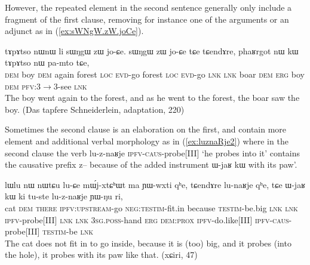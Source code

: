 \documentclass[oldfontcommands,oneside,a4paper,11pt]{article}
\newcommand{\ipa}[1]{{\phon \mbox{#1}}} %
\newcommand{\refb}[1]{(\ref{#1})}
\begin{document}
However, the repeated element in the second sentence generally only include a fragment of the first clause, removing for instance one of the arguments or an adjunct as in \refb{ex:sWNgW.zW.joCe}.

 \begin{exe}
\ex \label{ex:sWNgW.zW.joCe}
\gll 	\ipa{nɯ} 	\ipa{tɤpɤtso} 	\ipa{nɯnɯ} 	\ipa{li} 	\ipa{sɯŋgɯ} 	\ipa{zɯ} 	\ipa{jo-ɕe.} 	\ipa{sɯŋgɯ} 	\ipa{zɯ} 	\ipa{jo-ɕe} 	\ipa{tɕe} 	\ipa{tɕendɤre,} 	\ipa{phaʁrgot} 	\ipa{nɯ} 	\ipa{kɯ} 	\ipa{tɤpɤtso} 	\ipa{nɯ} 	\ipa{pa-mto} 	\ipa{tɕe,} 	\\
  \textsc{dem} boy \textsc{dem} again forest \textsc{loc} \textsc{evd}-go  forest \textsc{loc} \textsc{evd}-go \textsc{lnk} \textsc{lnk} boar \textsc{dem} \textsc{erg} boy \textsc{dem} \textsc{pfv}:3$\rightarrow$3-see \textsc{lnk}   \\
\glt The boy went again to the forest, and as he went to the forest, the boar saw the boy. (Das tapfere Schneiderlein, adaptation, 220)
\end{exe}


 

Sometimes the second clause is an elaboration on the first, and contain more element and additional verbal morphology as in \refb{ex:luznaRje2} where in the second clause the verb \ipa{lu-z-naʁje} \textsc{ipfv-caus}-probe[III] `he probes into it' contains the causative prefix \ipa{z--} because of the added instrument \ipa{ɯ-jaʁ} 	\ipa{kɯ}  with its paw'.

\begin{exe}
\ex \label{ex:luznaRje2}
\gll
\ipa{lɯlu} 	\ipa{nɯ} 	\ipa{nɯtɕu} 	\ipa{lu-ɕe} 	\ipa{mɯ́j-xtɕʰɯt} 	\ipa{ma} 	\ipa{ɲɯ-wxti} 	\ipa{qʰe,} 	\ipa{tɕendɤre} 	\ipa{lu-naʁje} 	\ipa{qʰe,}  \ipa{tɕe} 	\ipa{ɯ-jaʁ} 	\ipa{kɯ} 	\ipa{ki} 	\ipa{tu-ste} 	\ipa{lu-z-naʁje} 	\ipa{ɲɯ-ŋu} 	\ipa{ri,} \\
cat \textsc{dem} \textsc{there} \textsc{ipfv:upstream}-go  \textsc{neg:testim}-fit.in because \textsc{testim}-be.big \textsc{lnk}  \textsc{lnk} \textsc{ipfv}-probe[III] \textsc{lnk} \textsc{lnk} \textsc{3sg.poss}-hand \textsc{erg} \textsc{dem:prox} \textsc{ipfv}-do.like[III] \textsc{ipfv-caus}-probe[III] \textsc{testim}-be \textsc{lnk} \\
\glt The cat does not fit in to go inside, because it is (too) big, and it probes (into the hole), it probes with its paw like that. (xɕiri, 47)
\end{exe}
\end{document}

